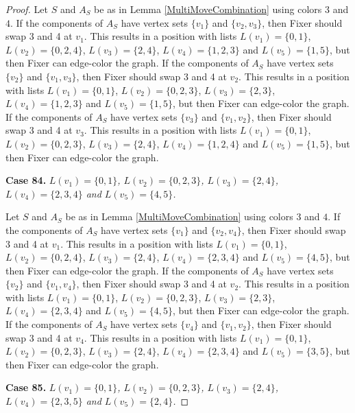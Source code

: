 \documentclass[12pt]{amsart}
\theoremstyle{plain}
\theoremstyle{definition}
\theoremstyle{remark}
\begin{document}
\begin{proof}
Let $S$ and $A_S$ be as in Lemma \ref{MultiMoveCombination} using colors $3$ and $4$. If the components of $A_S$ have vertex sets $\{v_1\}$ and $\{v_2, v_3\}$, then Fixer should swap 3 and 4 at $v_1$. This results in a position with lists $L(v_1) = \{0, 1\}$, $L(v_2) = \{0, 2, 4\}$, $L(v_3) = \{2, 4\}$, $L(v_4) = \{1, 2, 3\}$ and $L(v_5) = \{1, 5\}$, but then Fixer can edge-color the graph.
If the components of $A_S$ have vertex sets $\{v_2\}$ and $\{v_1, v_3\}$, then Fixer should swap 3 and 4 at $v_2$. This results in a position with lists $L(v_1) = \{0, 1\}$, $L(v_2) = \{0, 2, 3\}$, $L(v_3) = \{2, 3\}$, $L(v_4) = \{1, 2, 3\}$ and $L(v_5) = \{1, 5\}$, but then Fixer can edge-color the graph.
If the components of $A_S$ have vertex sets $\{v_3\}$ and $\{v_1, v_2\}$, then Fixer should swap 3 and 4 at $v_3$. This results in a position with lists $L(v_1) = \{0, 1\}$, $L(v_2) = \{0, 2, 3\}$, $L(v_3) = \{2, 4\}$, $L(v_4) = \{1, 2, 4\}$ and $L(v_5) = \{1, 5\}$, but then Fixer can edge-color the graph.

\noindent\textbf{Case 84.  }\textit{$L(v_1) = \{0, 1\}$, $L(v_2) = \{0, 2, 3\}$, $L(v_3) = \{2, 4\}$, $L(v_4) = \{2, 3, 4\}$ and $L(v_5) = \{4, 5\}$.}

Let $S$ and $A_S$ be as in Lemma \ref{MultiMoveCombination} using colors $3$ and $4$. If the components of $A_S$ have vertex sets $\{v_1\}$ and $\{v_2, v_4\}$, then Fixer should swap 3 and 4 at $v_1$. This results in a position with lists $L(v_1) = \{0, 1\}$, $L(v_2) = \{0, 2, 4\}$, $L(v_3) = \{2, 4\}$, $L(v_4) = \{2, 3, 4\}$ and $L(v_5) = \{4, 5\}$, but then Fixer can edge-color the graph.
If the components of $A_S$ have vertex sets $\{v_2\}$ and $\{v_1, v_4\}$, then Fixer should swap 3 and 4 at $v_2$. This results in a position with lists $L(v_1) = \{0, 1\}$, $L(v_2) = \{0, 2, 3\}$, $L(v_3) = \{2, 3\}$, $L(v_4) = \{2, 3, 4\}$ and $L(v_5) = \{4, 5\}$, but then Fixer can edge-color the graph.
If the components of $A_S$ have vertex sets $\{v_4\}$ and $\{v_1, v_2\}$, then Fixer should swap 3 and 4 at $v_4$. This results in a position with lists $L(v_1) = \{0, 1\}$, $L(v_2) = \{0, 2, 3\}$, $L(v_3) = \{2, 4\}$, $L(v_4) = \{2, 3, 4\}$ and $L(v_5) = \{3, 5\}$, but then Fixer can edge-color the graph.

\noindent\textbf{Case 85.  }\textit{$L(v_1) = \{0, 1\}$, $L(v_2) = \{0, 2, 3\}$, $L(v_3) = \{2, 4\}$, $L(v_4) = \{2, 3, 5\}$ and $L(v_5) = \{2, 4\}$.}


\end{proof}
\end{document}

